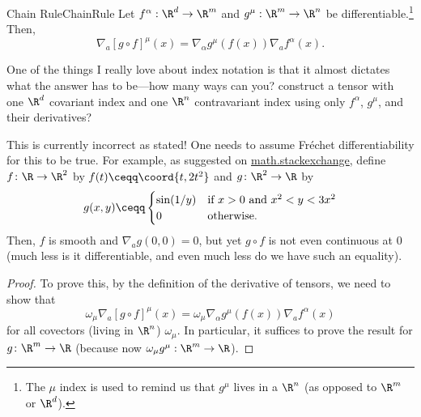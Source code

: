 \begin{prp}{Chain Rule}{ChainRule}
Let $f^\alpha :\R ^d\rightarrow \R ^m$ and $g^\mu :\R ^m\rightarrow \R ^n$ be differentiable.\footnote{The $\mu$ index is used to remind us that $g^\mu$ lives in a $\R ^n$ (as opposed to $\R ^m$ or $\R ^d$).}  Then,
\begin{equation}
\nabla _a[g\circ f]^\mu (x)=\nabla _\alpha g^\mu (f(x))\nabla _af^\alpha (x).
\end{equation}
\begin{rmk}
One of the things I really love about index notation is that it almost dictates what the answer has to be---how many ways can you? construct a tensor with one $\R ^d$ covariant index and one $\R ^n$ contravariant index using only $f^\alpha$, $g^\mu$, and their derivatives?
\end{rmk}
\begin{wrn}
This is currently incorrect as stated!  One needs to assume Fréchet differentiability for this to be true.  For example, as suggested on \href{http://math.stackexchange.com/questions/705847/counterexample-for-the-chain-rule-for-the-gateaux-derivative}{math.stackexchange}, define $f\colon \R \rightarrow \R ^2$ by $f(t)\ceqq \coord{t,2t^2}$ and $g\colon \R ^2\rightarrow \R$ by
\begin{equation}
g(x,y)\ceqq \begin{cases}\sin (1/y) & \text{if }x>0\text{ and }x^2<y<3x^2 \\ 0 & \text{otherwise.}\end{cases}
\end{equation}
Then, $f$ is smooth and $\nabla _ag(0,0)=0$, but yet $g\circ f$ is not even continuous at $0$ (much less is it differentiable, and even much less do we have such an equality).
\end{wrn}
\begin{proof}
To prove this, by the definition of the derivative of tensors, we need to show that
\begin{equation}
\omega _\mu \nabla _a[g\circ f]^\mu (x)=\omega _\mu \nabla _\alpha g^\mu (f(x))\nabla _af^\alpha (x)
\end{equation}
for all covectors (living in $\R ^n$) $\omega _\mu$.  In particular, it suffices to prove the result for $g\colon \R ^m\rightarrow \R$ (because now $\omega _\mu g^\mu :\R ^m\rightarrow \R$).


\end{proof}
\end{prp}
